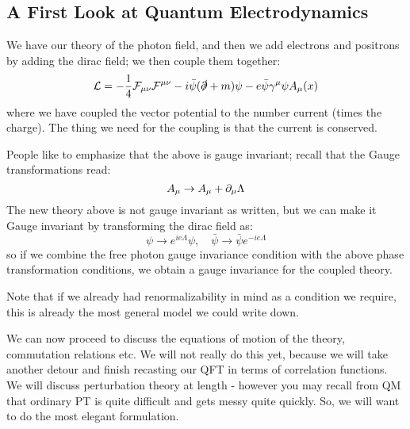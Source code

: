 \subsection{A First Look at Quantum Electrodynamics}
We have our theory of the photon field, and then we add electrons and positrons by adding the dirac field; we then couple them together:
\begin{equation}
    \mathcal{L} = -\frac{1}{4}\mathcal{F}_{\mu\nu}\mathcal{F}^{\mu\nu} - i\bar{\psi}(\slashed{\partial} + m)\psi - e\bar{\psi}\gamma^\mu \psi A_\mu(x)
\end{equation}
where we have coupled the vector potential to the number current (times the charge). The thing we need for the coupling is that the current is conserved. 

People like to emphasize that the above is gauge invariant; recall that the Gauge transformations read:
\begin{equation}
    A_\mu \to A_\mu + \partial_\mu \Lambda
\end{equation}
The new theory above is not gauge invariant as written, but we can make it Gauge invariant by transforming the dirac field as:
\begin{equation}
    \psi \to e^{ie\Lambda}\psi, \quad \bar{\psi} \to \bar{\psi}e^{-ie\Lambda}
\end{equation}
so if we combine the free photon gauge invariance condition with the above phase transformation conditions, we obtain a gauge invariance for the coupled theory.

Note that if we already had renormalizability in mind as a condition we require, this is already the most general model we could write down.

We can now proceed to discuss the equations of motion of the theory, commutation relations etc. We will not really do this yet, because we will take another detour and finish recasting our QFT in terms of correlation functions. We will discuss perturbation theory at length - however you may recall from QM that ordinary PT is quite difficult and gets messy quite quickly. So, we will want to do the most elegant formulation.

